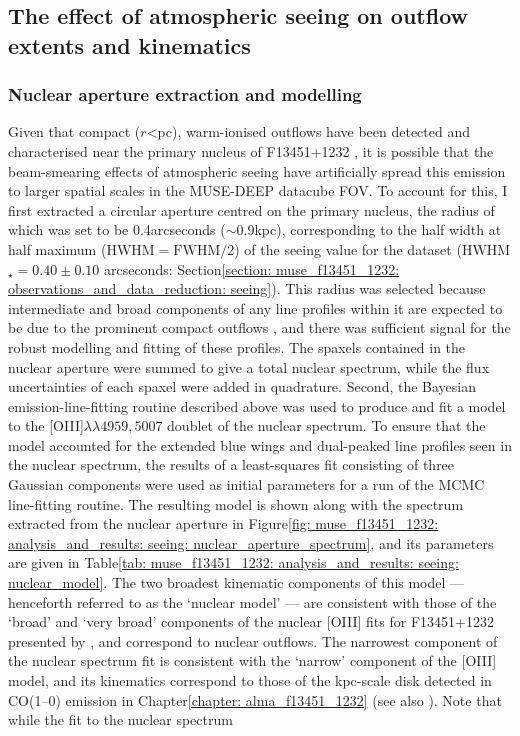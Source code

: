 \subsection{The effect of atmospheric seeing on outflow extents and kinematics}
\label{section: muse_f13451_1232: analysis_and_results: seeing}

\subsubsection{Nuclear aperture extraction and modelling}
\label{section: muse_f13451_1232: analysis_and_results: seeing: nuclear_aperture_extraction}

Given that compact ($r$\;\textless{}\;pc), warm-ionised outflows have been detected and characterised near the primary nucleus of F13451+1232 \citep{Holt2003, Holt2011, Rose2018, Tadhunter2018}, it is possible that the beam-smearing effects of atmospheric seeing have artificially spread this emission to larger spatial scales in the MUSE-DEEP datacube FOV. To account for this, I first extracted a circular aperture centred on the primary nucleus, the radius of which was set to be 0.4\;arcseconds ($\sim$0.9\;kpc), corresponding to the half width at half maximum ($\mathrm{HWHM}=\mathrm{FWHM}/2$) of the seeing value for the dataset (HWHM$_\star=0.40\pm0.10$ arcseconds: Section\;\ref{section: muse_f13451_1232: observations_and_data_reduction: seeing}). This radius was selected because intermediate and broad components of any line profiles within it are expected to be due to the prominent compact outflows \citep{Holt2003, Holt2011}, and there was sufficient signal for the robust modelling and fitting of these profiles. The spaxels contained in the nuclear aperture were summed to give a total nuclear spectrum, while the flux uncertainties of each spaxel were added in quadrature. Second, the Bayesian emission-line-fitting routine described above was used to produce and fit a model to the [OIII]$\lambda\lambda4959,5007$ doublet of the nuclear spectrum. To ensure that the model accounted for the extended blue wings and dual-peaked line profiles seen in the nuclear spectrum, the results of a least-squares fit consisting of three Gaussian components were used as initial parameters for a run of the MCMC line-fitting routine. The resulting model is shown along with the spectrum extracted from the nuclear aperture in Figure\;\ref{fig: muse_f13451_1232: analysis_and_results: seeing: nuclear_aperture_spectrum}, and its parameters are given in Table\;\ref{tab: muse_f13451_1232: analysis_and_results: seeing: nuclear_model}. The two broadest kinematic components of this model  --- henceforth referred to as the `nuclear model' --- are consistent with those of the `broad' and `very broad' components of the nuclear [OIII] fits for F13451+1232 presented by \citet{Rose2018}, and correspond to nuclear outflows. The narrowest component of the nuclear spectrum fit is consistent with the `narrow' component of the \citet{Rose2018} [OIII] model, and its kinematics correspond to those of the kpc-scale disk detected in CO(1--0) emission in Chapter\;\ref{chapter: alma_f13451_1232} (see also \citealt{Lamperti2022}). Note that while the fit to the nuclear spectrum 